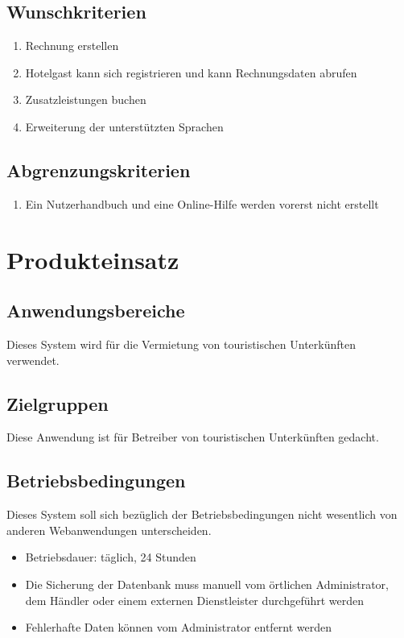 \documentclass[a4paper,oneside]{scrreprt}
\begin{document}
\section{Wunschkriterien}

\begin{enumerate}
\item Rechnung erstellen
\item Hotelgast kann sich registrieren und kann Rechnungsdaten abrufen
\item Zusatzleistungen buchen
\item Erweiterung der unterstützten Sprachen
\end{enumerate}

\section{Abgrenzungskriterien}
\begin{enumerate}
\item Ein Nutzerhandbuch und eine Online-Hilfe werden vorerst nicht erstellt
\end{enumerate}





\chapter{Produkteinsatz}
\section{Anwendungsbereiche}

Dieses System wird für die Vermietung von touristischen Unterkünften verwendet.


\section{Zielgruppen}

Diese Anwendung ist für Betreiber von touristischen Unterkünften gedacht.

\section{Betriebsbedingungen}
Dieses System soll sich bezüglich der Betriebsbedingungen nicht wesentlich von anderen Webanwendungen unterscheiden.

\begin{itemize}
\item Betriebsdauer: täglich, 24 Stunden
\item Die Sicherung der Datenbank muss manuell vom örtlichen Administrator, dem Händler oder einem externen Dienstleister durchgeführt werden
\item Fehlerhafte Daten können vom Administrator entfernt werden
\end{itemize}
\end{document}
